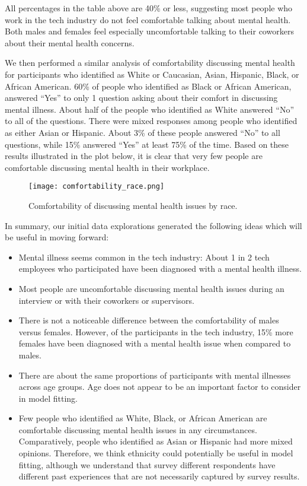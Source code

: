 \documentclass[times, twocolumn]{article}
\begin{document}
All percentages in the table above are 40\% or less, suggesting most people who
work in the tech industry do not feel comfortable talking about mental health.
Both males and females feel especially uncomfortable talking to their coworkers
about their mental health concerns.

We then performed a similar analysis of comfortability discussing mental health
for participants who identified as White or Caucasian, Asian, Hispanic, Black,
or African American. 60\% of people who identified as Black or African American,
answered “Yes” to only 1 question asking about their comfort in discussing
mental illness. About half of the people who identified as White answered
“No” to all of the questions. There were mixed responses among people who identified
as either Asian or Hispanic. About 3\% of these people answered “No” to all
questions, while 15\% answered “Yes” at least 75\% of the time. Based on these
results illustrated in the plot below, it is clear that very few people are
comfortable discussing mental health in their workplace.


\begin{figure}
    \centering
    \texttt{[image: comfortability\_race.png]}
    \caption{Comfortability of discussing mental health issues by race.}
    \label{fig:comfortability_race}
\end{figure}


In summary, our initial data explorations generated the following ideas which
will be useful in moving forward:

\begin{itemize}
    \item Mental illness seems common in the tech industry: About 1 in 2 tech
    employees who participated have been diagnosed with a mental health illness.

    \item Most people are uncomfortable discussing mental health issues during
    an interview or with their coworkers or supervisors.

    \item There is not a noticeable difference between the comfortability of
    males versus females. However, of the participants in the tech industry,
    15\% more females have been diagnosed with a mental health issue when
    compared to males.

    \item There are about the same proportions of participants with mental
    illnesses across age groups. Age does not appear to be an important factor
    to consider in model fitting.

    \item Few people who identified as White, Black, or African American are
    comfortable discussing mental health issues in any circumstances.
    Comparatively, people who identified as Asian or Hispanic had more mixed opinions.
    Therefore, we think ethnicity could potentially be useful in model fitting,
    although we understand that survey different respondents have different past
    experiences that are not necessarily captured by survey results.

\end{itemize}
\end{document}
